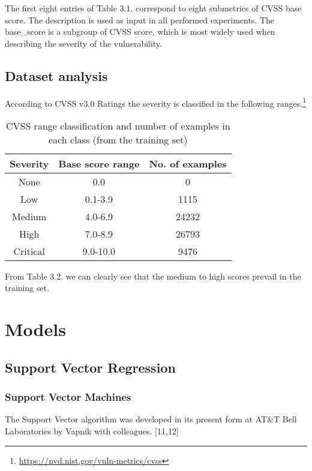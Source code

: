 \documentclass[times, utf8, zavrsni, english]{fer}
\begin{document}
The first eight entries of Table 3.1. correspond to eight submetrics of CVSS base score.
The description is used as input in all performed experiments.
The base\_score is a subgroup of CVSS score, which is most widely used when describing the severity of the vulnerability.

\section{Dataset analysis}
According to CVSS v3.0 Ratings the severity is classified in the following ranges.\footnote{\url{https://nvd.nist.gov/vuln-metrics/cvss}}
\begin{table}[h!]
	\centering
	\begin{tabular}{| c c c ||} 
		\hline
		Severity & Base score range & No. of examples\\ [0.5ex] 
		\hline\hline
		
		None & 0.0 & 0  \\
		Low &  0.1-3.9 & 1115 \\
		Medium & 4.0-6.9 & 24232  \\
		High & 7.0-8.9  & 26793 \\
		Critical & 9.0-10.0 & 9476\\
		\hline
	\end{tabular}
	\caption{CVSS range classification and number of examples in each class (from the training set)}
	\label{table:2}
\end{table}

From Table 3.2. we can clearly see that the medium to high scores prevail in the training set.

\chapter{Models}

\section{Support Vector Regression}
\subsection{Support Vector Machines}
The Support Vector algorithm was developed in its present form at AT\&T Bell Laboratories by Vapnik with colleagues. [11,12] \\
\end{document}
